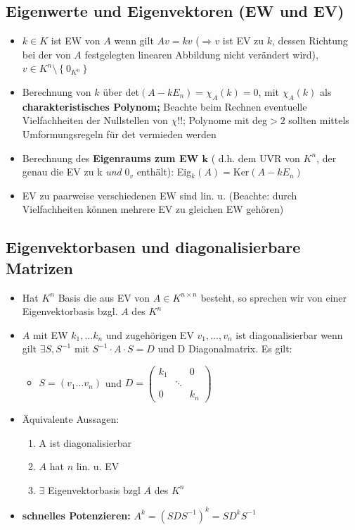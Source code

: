 \documentclass[10pt,a4paper]{article}
\begin{document}
\subsection{Eigenwerte und Eigenvektoren (EW und EV)}
\begin{itemize}
\item $k\in K$ ist EW von $A$ wenn gilt $Av=kv$ ($\Rightarrow v$ ist EV zu $k$, dessen Richtung bei der von $A$ festgelegten linearen Abbildung nicht verändert wird), $v\in K^{n}\setminus \left\lbrace 0_{K^{n}}\right\rbrace$
\item Berechnung von $k$ über det$(A-kE_{n})=\chi_{A}(k)=0$, mit $\chi_{A}(k)$ als \textbf{charakteristisches Polynom;} Beachte beim Rechnen eventuelle Vielfachheiten der Nullstellen von $\chi$!!; Polynome mit deg$>2$ sollten mittels  Umformungsregeln für det vermieden werden
\item Berechnung des \textbf{Eigenraums zum EW $\boldsymbol{k}$} ( d.h. dem UVR von $K^{n}$, der genau die EV zu k \textit{und} $0_{v}$ enthält): Eig$_{k}(A)=\text{Ker}(A-kE_{n})$
\item EV zu paarweise verschiedenen EW sind lin. u. (Beachte: durch Vielfachheiten können mehrere EV zu gleichen EW gehören)
\end{itemize}



\subsection{Eigenvektorbasen und diagonalisierbare Matrizen}
\begin{itemize}
\item Hat $K^{n}$ Basis die aus EV von $A\in K^{n\times n}$ besteht, so sprechen wir von einer Eigenvektorbasis bzgl. $A$ des $K^{n}$
\item $A$ mit EW $k_{1},\dotsc k_{n}$ und zugehörigen EV $v_{1},\dotsc,v_{n}$ ist diagonalisierbar wenn gilt $\exists S,S^{-1}$ mit $S^{-1}\cdot A \cdot S =D$ und D Diagonalmatrix. Es gilt:
\begin{itemize}
\item$S=(v_{1}\dotsc v_{n})$ und $ D=\begin{pmatrix}
k_{1}&&0\\&\ddots&\\0&&k_{n}
\end{pmatrix}$
\end{itemize}
\item Äquivalente Aussagen:
\begin{enumerate}
\item A ist diagonalisierbar
\item $A$ hat $n$ lin. u. EV
\item $\exists$ Eigenvektorbasis bzgl $A$ des $K^{n}$
\end{enumerate}
\item \textbf{schnelles Potenzieren:} $A^{k}=(SDS^{-1})^{k}=SD^{k}S^{-1}$
\end{itemize}
\end{document}
